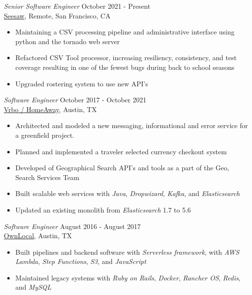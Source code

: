 \documentclass[margin, 10pt]{res} %
\begin{document}
\begin{resume}
{\sl Senior Software Engineer} \hfill October 2021 - Present \\
\href{https://web.seesaw.me/}{Seesaw}, Remote, San Francisco, CA
\begin{itemize}
    \item Maintaining a CSV processing pipeline and administrative interface using python and the tornado web server
    \item Refactored CSV Tool processor, increasing resiliency, consistency, and test coverage resulting in one of the fewest bugs during back to school seasons
    \item Upgraded rostering system to use new API's
\end{itemize}

{\sl Software Engineer} \hfill October 2017 - October 2021 \\
\href{https://www.vrbo.com/}{Vrbo / HomeAway}, Austin, TX
\begin{itemize}
    \item Architected and modeled a new messaging, informational and error service for a greenfield project. 
    \item Planned and implemented a traveler selected currency checkout system
    \item Developed of Geographical Search API's and tools as a part of the Geo, Search Services Team
    \item Built scalable web services with {\it Java}, {\it Dropwizard}, {\it Kafka}, and {\it Elasticsearch}
    \item Updated an existing monolith from {\it Elasticsearch} 1.7 to 5.6
\end{itemize}


{\sl Software Engineer } \hfill August 2016 - August 2017 \\
\href{https://www.ownlocal.com}{OwnLocal}, Austin, TX
\begin{itemize}
    \item Built pipelines and backend software with {\it Serverless framework}, with {\it AWS Lambda}, {\it Step Functions}, {\it S3}, and {\it JavaScript}
    \item Maintained legacy systems with {\it Ruby on Rails}, {\it Docker}, {\it Rancher OS}, {\it Redis}, and {\it MySQL}
\end{itemize}


\end{resume}
\end{document}
